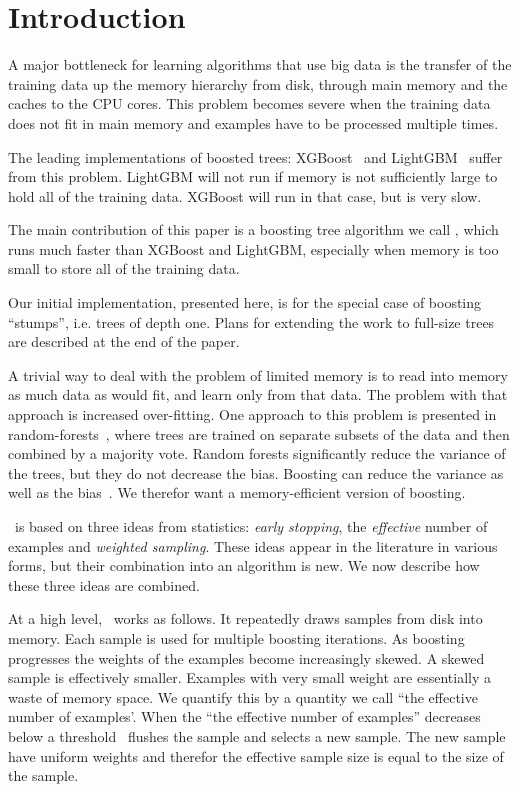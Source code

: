 \section{Introduction}\label{sec:intro}
A major bottleneck for learning algorithms that use big data is the
transfer of the training data up the memory hierarchy from disk,
through main memory and the caches to the CPU cores. This problem
becomes severe when the training data does not fit in main memory and
examples have to be processed multiple times.

The leading implementations of boosted trees: XGBoost~\cite{chen_xgboost:_2016} and
LightGBM~\cite{ke_lightgbm:_2017} suffer from this problem. LightGBM
will not run if memory is not sufficiently large to hold all of the
training data. XGBoost will run in that case, but is very slow.

The main contribution of this paper is a boosting tree algorithm we
call \Sparrow, which runs much faster than XGBoost and LightGBM,
especially when memory is too small to store all of the training data.

Our initial implementation, presented here, is for the special case of
boosting ``stumps'', i.e. trees of depth one. Plans for extending the
work to full-size trees are described at the end of the paper.

A trivial way to deal with the problem of limited memory is to read
into memory as much data as would fit, and learn only from that data.
The problem with that approach is increased over-fitting. One approach
to this problem is presented in random-forests~\cite{breiman_random_2001},
where trees are trained on separate subsets of the data and then
combined by a majority vote. Random forests significantly reduce the
variance of the trees, but they do not decrease the bias. Boosting can
reduce the variance as well as the bias~\cite{schapire_boosting_1998}. We
therefor want a memory-efficient version of boosting.

\Sparrow\ is based on three ideas from statistics: {\em early stopping},
the {\em effective} number of examples and {\em weighted
  sampling}. These ideas appear in the literature in various forms, but their
combination into an algorithm is new. We now describe how these three
ideas are combined.

At a high level, \Sparrow\ works as follows. It repeatedly draws
samples from disk into memory. Each sample is
used for multiple boosting iterations. As boosting progresses the
weights of the examples become increasingly skewed. A skewed sample is
effectively smaller. Examples with very small weight are essentially a
waste of memory space. We quantify this by a quantity we call ``the
effective number of examples'. When the  ``the effective number
of examples'' decreases below a threshold \Sparrow\ flushes the sample
and selects a new sample. The new sample have uniform weights and
therefor the effective sample size is equal to the size of the sample.

